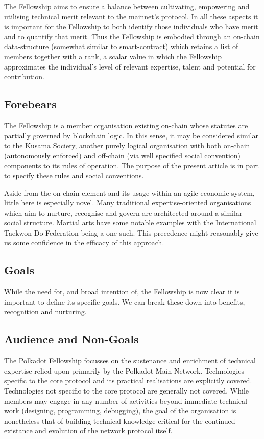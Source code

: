 \documentclass[9pt,oneside]{amsart}
\begin{document}
The Fellowship aims to ensure a balance between cultivating, empowering and utilising technical merit relevant to the mainnet's protocol. In all these aspects it is important for the Fellowship to both identify those individuals who have merit and to quantify that merit. Thus the Fellowship is embodied through an on-chain data-structure (somewhat similar to smart-contract) which retains a list of members together with a rank, a scalar value in which the Fellowship approximates the individual's level of relevant expertise, talent and potential for contribution.

\subsection{Forebears}

The Fellowship is a member organisation existing on-chain whose statutes are partially governed by blockchain logic. In this sense, it may be considered similar to the Kusama Society, another purely logical organisation with both on-chain (autonomously enforced) and off-chain (via well specified social convention) components to its rules of operation. The purpose of the present article is in part to specify these rules and social conventions.

Aside from the on-chain element and its usage within an agile economic system, little here is especially novel. Many traditional expertise-oriented organisations which aim to nurture, recognise and govern are architected around a similar social structure. Martial arts have some notable examples with the International Taekwon-Do Federation being a one such. This precedence might reasonably give us some confidence in the efficacy of this approach.

\subsection{Goals}\label{goals}

While the need for, and broad intention of, the Fellowship is now clear it is important to define its specific goals. We can break these down into benefits, recognition and nurturing.

\subsection{Audience and Non-Goals}

The Polkadot Fellowship focusses on the sustenance and enrichment of technical expertise relied upon primarily by the Polkadot Main Network. Technologies specific to the core protocol and its practical realisations are explicitly covered. Technologies not specific to the core protocol are generally not covered. While members may engage in any number of activities beyond immediate technical work (designing, programming, debugging), the goal of the organisation is nonetheless that of building technical knowledge critical for the continued existance and evolution of the network protocol itself.
\end{document}
